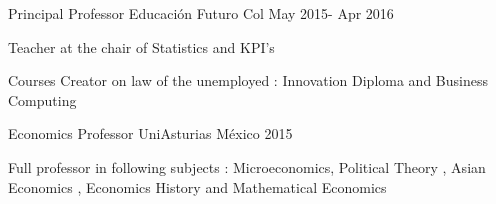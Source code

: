 \begin{cventries}
  \cventry
    {Principal Professor} %
    {Educación Futuro} %
    {Col} %
    {May 2015- Apr 2016} %
    {
      \begin{cvitems} %
        \item {Teacher at the chair of Statistics and KPI's}
        \item {Courses Creator on law of the unemployed : Innovation Diploma and Business Computing}
      \end{cvitems}
    }

  \cventry
    {Economics Professor} %
    {UniAsturias} %
    {México} %
    {2015} %
    {
      \begin{cvitems} %
        \item {Full professor in following subjects : Microeconomics, Political Theory , Asian Economics , Economics History and Mathematical Economics}
      \end{cvitems}
    }

\end{cventries}
